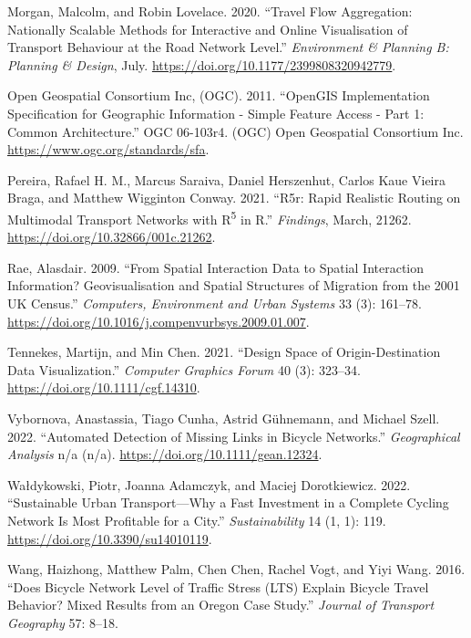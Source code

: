 \documentclass{isprs} %
\newlength{\cslhangindent}
\newlength{\cslentryspacingunit} %
\newenvironment{CSLReferences}[2] %
 {%
  \setlength{\parindent}{0pt}
  \ifodd #1
  \let\oldpar\par
  \def\par{\hangindent=\cslhangindent\oldpar}
  \fi
  \setlength{\parskip}{#2\cslentryspacingunit}
 }%
 {}
\begin{document}
\begin{CSLReferences}{1}{0}
\leavevmode{}%
Morgan, Malcolm, and Robin Lovelace. 2020. {``Travel Flow Aggregation: Nationally Scalable Methods for Interactive and Online Visualisation of Transport Behaviour at the Road Network Level.''} \emph{Environment \& Planning B: Planning \& Design}, July. \url{https://doi.org/10.1177/2399808320942779}.

\leavevmode{}%
Open Geospatial Consortium Inc, (OGC). 2011. {``{OpenGIS Implementation Specification} for {Geographic} Information - {Simple} Feature Access - {Part} 1: {Common} Architecture.''} OGC 06-103r4. {(OGC) Open Geospatial Consortium Inc.} \url{https://www.ogc.org/standards/sfa}.

\leavevmode{}%
Pereira, Rafael H. M., Marcus Saraiva, Daniel Herszenhut, Carlos Kaue Vieira Braga, and Matthew Wigginton Conway. 2021. {``R5r: {Rapid Realistic Routing} on {Multimodal Transport Networks} with {R}{\textsuperscript{5}} in {R}.''} \emph{Findings}, March, 21262. \url{https://doi.org/10.32866/001c.21262}.

\leavevmode{}%
Rae, Alasdair. 2009. {``From Spatial Interaction Data to Spatial Interaction Information? {Geovisualisation} and Spatial Structures of Migration from the 2001 {UK} Census.''} \emph{Computers, Environment and Urban Systems} 33 (3): 161--78. \url{https://doi.org/10.1016/j.compenvurbsys.2009.01.007}.

\leavevmode{}%
Tennekes, Martijn, and Min Chen. 2021. {``Design {Space} of {Origin-Destination Data Visualization}.''} \emph{Computer Graphics Forum} 40 (3): 323--34. \url{https://doi.org/10.1111/cgf.14310}.

\leavevmode{}%
Vybornova, Anastassia, Tiago Cunha, Astrid Gühnemann, and Michael Szell. 2022. {``Automated {Detection} of {Missing Links} in {Bicycle Networks}.''} \emph{Geographical Analysis} n/a (n/a). \url{https://doi.org/10.1111/gean.12324}.

\leavevmode{}%
Wałdykowski, Piotr, Joanna Adamczyk, and Maciej Dorotkiewicz. 2022. {``Sustainable {Urban Transport}---{Why} a {Fast Investment} in a {Complete Cycling Network Is Most Profitable} for a {City}.''} \emph{Sustainability} 14 (1, 1): 119. \url{https://doi.org/10.3390/su14010119}.

\leavevmode{}%
Wang, Haizhong, Matthew Palm, Chen Chen, Rachel Vogt, and Yiyi Wang. 2016. {``Does Bicycle Network Level of Traffic Stress ({LTS}) Explain Bicycle Travel Behavior? {Mixed} Results from an {Oregon} Case Study.''} \emph{Journal of Transport Geography} 57: 8--18.

\end{CSLReferences}
\end{document}
